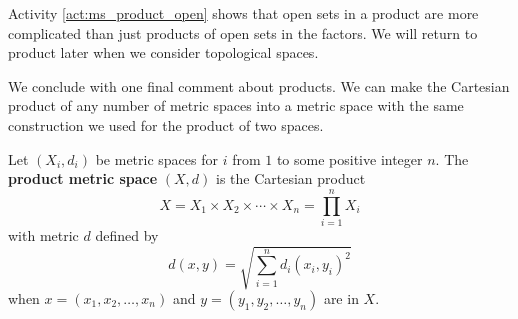\begin{comment}

\ActivitySolution

\ba
\item The points of the form $(x_1,x_2)$ with $1 \leq x_1 \leq 2$ and $3 \leq x_2 \leq 4$ is the square in $\R^2$ with sides of length $1$ parallel to the coordinate axes and center at $(1.5,3.5)$. 

\item Let $B_1 = B(a,r)$ be an open ball in $X_1$ and $B_2 = B(b,s)$ be an open ball in $X_2$. Then $B_1 = (a-r,a+r)$ and $B_2 = (b-s,b+s)$. The set $B_1 \times B_2$ is the rectangle $R = \{(x,y) \mid a-r<x<a+r, b-s<y<b+s\}$ in $\R^2$. But an open ball using the Euclidean metric is an open disk, not a rectangle. 

\item Let $B_1 = (a-r,a+r)$ be an open ball in $X_1$ and $B_2 = (b-s,b+s)$ be an open ball in $X_2$. Let $(u,v) \in B_1 \times B_2$. Then $u \in B_1$ and $v \in B_2$. Let $\epsilon = \min\{r-d_1(a,u), s-d_2(b,v)\}$. Let $(w,z) \in B((u,v),\epsilon)$. Then 
\[d_1(a,w) \leq d_1(a,u) + d_1(u,w) < d_1(a,u) + (r-d_1(a,u)) = r\]
and
\[d_2(b,z) \leq d_2(b,v) + d_2(v,z) < d_2(b,v) + (s-d_2(b,v)) = s.\]
So $B((u,v),\epsilon) \subseteq (B_1 \times B_2)$. This makes $B_1 \times B_2$ a neighborhood of each of its points and so $B_1 \times B_2$ is an open set. 

\ea

\end{comment}

Activity \ref{act:ms_product_open} shows that open sets in a product are more complicated than just products of open sets in the factors. We will return to product later when we consider topological spaces. 

We conclude with one final comment about products. We can make the Cartesian product of any number of metric spaces into a metric space with the same construction we used for the product of two spaces. 

\begin{definition} Let $(X_i, d_i)$ be metric spaces for $i$ from $1$ to some positive integer $n$. The \textbf{product metric space} $(X,d)$ is the Cartesian product
\[X = X_1 \times X_2 \times \cdots \times X_n = \prod_{i=1}^n X_i\]
with metric $d$ defined by 
\[d(x,y) = \sqrt{\sum_{i=1}^n d_i(x_i,y_i)^2}\]
when $x = (x_1, x_2, \ldots, x_n)$ and $y = (y_1, y_2, \ldots, y_n)$ are in $X$.
\end{definition}

